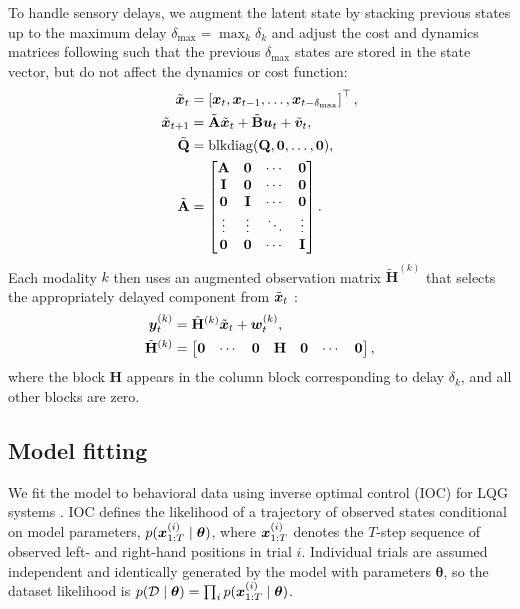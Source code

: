 \documentclass{article}
\begin{document}
To handle sensory delays, we augment the latent state by stacking previous states up to the maximum delay $\delta_{\max}=\max_k \delta_k$ and adjust the cost and dynamics matrices following \citet{izawa2008line} such that the previous $\delta_{\max}$ states are stored in the state vector, but do not affect the dynamics or cost function:
\begin{align}
    \tilde{{\bm x}}_t &= \left[{\bm x}_t, {\bm x}_{t-1}, \dots, {\bm x}_{t-\delta_{\max}}\right]^\top, \\
    \tilde{{\bm x}}_{t+1} &= \tilde{\mathbf A} \tilde{{\bm x}}_t + \tilde{\mathbf B} {\bm u}_t + \tilde{{\bm v}}_t, \\
    \tilde{\mathbf Q} &= \operatorname{blkdiag}(\mathbf Q, \mathbf 0, \dots, \mathbf 0), \\
    \tilde{\mathbf A} &= \begin{bmatrix} \mathbf A & \mathbf 0 & \cdots & \mathbf 0 \\ \operatorname{{\mathbf{I}}} & \mathbf 0 & \cdots & \mathbf 0 \\ \mathbf 0 & \operatorname{{\mathbf{I}}} & \cdots & \mathbf 0 \\ \vdots & \vdots & \ddots & \vdots \\ \mathbf 0 & \mathbf 0 & \cdots & \operatorname{{\mathbf{I}}} \end{bmatrix}.
\end{align}
Each modality $k$ then uses an augmented observation matrix $\tilde{\mathbf H}^{(k)}$ that selects the appropriately delayed component from $\tilde{{\bm x}}_t$ \citep[see][]{crevecoeur2016dynamic}:
\begin{align}
    {\bm y}_t^{(k)} &= \tilde{\mathbf H}^{(k)} \tilde{{\bm x}}_t + {\bm w}_t^{(k)}, \\
    \tilde{\mathbf H}^{(k)} &= \begin{bmatrix} \mathbf 0 & \cdots & \mathbf 0 & \mathbf H & \mathbf 0 & \cdots & \mathbf 0 \end{bmatrix},
\end{align}
where the block $\mathbf H$ appears in the column block corresponding to delay $\delta_k$, and all other blocks are zero.


\subsection{Model fitting}
We fit the model to behavioral data using inverse optimal control (IOC) for LQG systems \citep{straub2022putting}. IOC defines the likelihood of a trajectory of observed states conditional on model parameters, $p({\bm x}_{1:T}^{(i)} \mid \bm\theta)$, where ${\bm x}_{1:T}^{(i)}$ denotes the $T$-step sequence of observed left- and right-hand positions in trial $i$. Individual trials are assumed independent and identically generated by the model with parameters $\bm\theta$, so the dataset likelihood is $p(\mathcal{D} \mid \bm\theta)=\prod_i p({\bm x}_{1:T}^{(i)}\mid\bm\theta)$.
\end{document}
